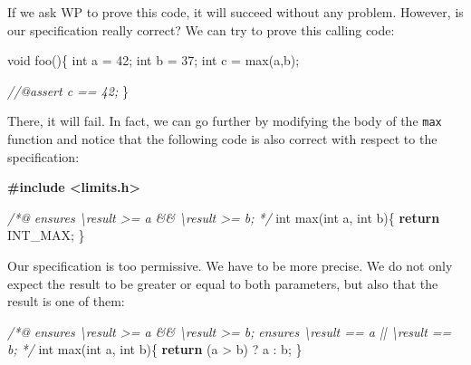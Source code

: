 \documentclass[12pt,francais,]{scrbook}
\newenvironment{Shaded}{}{}
\newcommand{\KeywordTok}[1]{\textcolor[rgb]{0.00,0.44,0.13}{\textbf{{#1}}}}
\newcommand{\DataTypeTok}[1]{\textcolor[rgb]{0.56,0.13,0.00}{{#1}}}
\newcommand{\DecValTok}[1]{\textcolor[rgb]{0.25,0.63,0.44}{{#1}}}
\newcommand{\CommentTok}[1]{\textcolor[rgb]{0.38,0.63,0.69}{\textit{{#1}}}}
\newcommand{\ErrorTok}[1]{\textcolor[rgb]{1.00,0.00,0.00}{\textbf{{#1}}}}
\newcommand{\NormalTok}[1]{{#1}}
\begin{document}
If we ask WP to prove this code, it will succeed without any problem.
However, is our specification really correct? We can try to prove this
calling code:

\begin{footnotesize}\begin{Shaded}
\begin{Highlighting}[]
\DataTypeTok{void} \NormalTok{foo()\{}
  \DataTypeTok{int} \NormalTok{a = }\DecValTok{42}\NormalTok{;}
  \DataTypeTok{int} \NormalTok{b = }\DecValTok{37}\NormalTok{;}
  \DataTypeTok{int} \NormalTok{c = max(a,b);}

  \CommentTok{//@assert c == 42;}
\NormalTok{\}}
\end{Highlighting}
\end{Shaded}\end{footnotesize}

There, it will fail. In fact, we can go further by modifying the body of
the \texttt{max} function and notice that the following code is also
correct with respect to the specification:

\begin{footnotesize}\begin{Shaded}
\begin{Highlighting}[]
\ErrorTok{#include <limits.h>}

\CommentTok{/*@}
\CommentTok{  ensures \textbackslash{}result >= a && \textbackslash{}result >= b;}
\CommentTok{*/}
\DataTypeTok{int} \NormalTok{max(}\DataTypeTok{int} \NormalTok{a, }\DataTypeTok{int} \NormalTok{b)\{}
  \KeywordTok{return} \NormalTok{INT_MAX;}
\NormalTok{\}}
\end{Highlighting}
\end{Shaded}\end{footnotesize}

Our specification is too permissive. We have to be more precise. We do
not only expect the result to be greater or equal to both parameters,
but also that the result is one of them:

\begin{footnotesize}\begin{Shaded}
\begin{Highlighting}[]
\CommentTok{/*@}
\CommentTok{  ensures \textbackslash{}result >= a && \textbackslash{}result >= b;}
\CommentTok{  ensures \textbackslash{}result == a || \textbackslash{}result == b;}
\CommentTok{*/}
\DataTypeTok{int} \NormalTok{max(}\DataTypeTok{int} \NormalTok{a, }\DataTypeTok{int} \NormalTok{b)\{}
  \KeywordTok{return} \NormalTok{(a > b) ? a : b;}
\NormalTok{\}}
\end{Highlighting}
\end{Shaded}\end{footnotesize}
\end{document}
